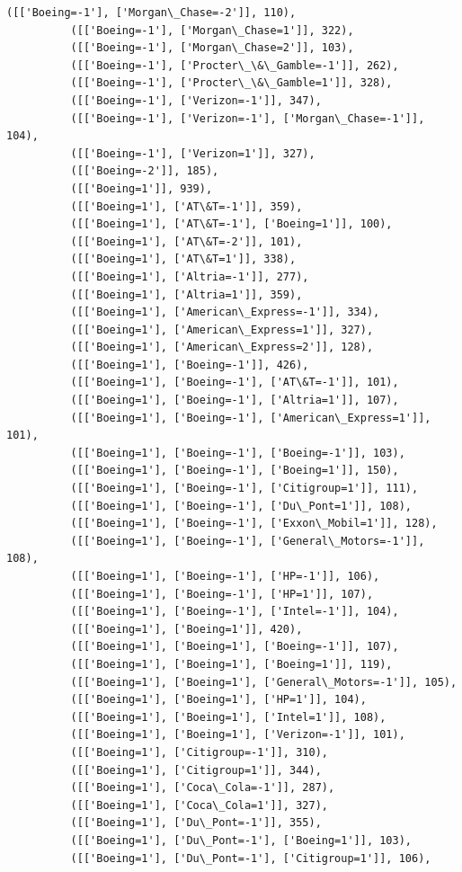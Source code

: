 \documentclass[11pt]{article}
\begin{document}
\begin{Verbatim}[commandchars=\\\{\}]
          ([['Boeing=-1'], ['Morgan\_Chase=-2']], 110),
          ([['Boeing=-1'], ['Morgan\_Chase=1']], 322),
          ([['Boeing=-1'], ['Morgan\_Chase=2']], 103),
          ([['Boeing=-1'], ['Procter\_\&\_Gamble=-1']], 262),
          ([['Boeing=-1'], ['Procter\_\&\_Gamble=1']], 328),
          ([['Boeing=-1'], ['Verizon=-1']], 347),
          ([['Boeing=-1'], ['Verizon=-1'], ['Morgan\_Chase=-1']], 104),
          ([['Boeing=-1'], ['Verizon=1']], 327),
          ([['Boeing=-2']], 185),
          ([['Boeing=1']], 939),
          ([['Boeing=1'], ['AT\&T=-1']], 359),
          ([['Boeing=1'], ['AT\&T=-1'], ['Boeing=1']], 100),
          ([['Boeing=1'], ['AT\&T=-2']], 101),
          ([['Boeing=1'], ['AT\&T=1']], 338),
          ([['Boeing=1'], ['Altria=-1']], 277),
          ([['Boeing=1'], ['Altria=1']], 359),
          ([['Boeing=1'], ['American\_Express=-1']], 334),
          ([['Boeing=1'], ['American\_Express=1']], 327),
          ([['Boeing=1'], ['American\_Express=2']], 128),
          ([['Boeing=1'], ['Boeing=-1']], 426),
          ([['Boeing=1'], ['Boeing=-1'], ['AT\&T=-1']], 101),
          ([['Boeing=1'], ['Boeing=-1'], ['Altria=1']], 107),
          ([['Boeing=1'], ['Boeing=-1'], ['American\_Express=1']], 101),
          ([['Boeing=1'], ['Boeing=-1'], ['Boeing=-1']], 103),
          ([['Boeing=1'], ['Boeing=-1'], ['Boeing=1']], 150),
          ([['Boeing=1'], ['Boeing=-1'], ['Citigroup=1']], 111),
          ([['Boeing=1'], ['Boeing=-1'], ['Du\_Pont=1']], 108),
          ([['Boeing=1'], ['Boeing=-1'], ['Exxon\_Mobil=1']], 128),
          ([['Boeing=1'], ['Boeing=-1'], ['General\_Motors=-1']], 108),
          ([['Boeing=1'], ['Boeing=-1'], ['HP=-1']], 106),
          ([['Boeing=1'], ['Boeing=-1'], ['HP=1']], 107),
          ([['Boeing=1'], ['Boeing=-1'], ['Intel=-1']], 104),
          ([['Boeing=1'], ['Boeing=1']], 420),
          ([['Boeing=1'], ['Boeing=1'], ['Boeing=-1']], 107),
          ([['Boeing=1'], ['Boeing=1'], ['Boeing=1']], 119),
          ([['Boeing=1'], ['Boeing=1'], ['General\_Motors=-1']], 105),
          ([['Boeing=1'], ['Boeing=1'], ['HP=1']], 104),
          ([['Boeing=1'], ['Boeing=1'], ['Intel=1']], 108),
          ([['Boeing=1'], ['Boeing=1'], ['Verizon=-1']], 101),
          ([['Boeing=1'], ['Citigroup=-1']], 310),
          ([['Boeing=1'], ['Citigroup=1']], 344),
          ([['Boeing=1'], ['Coca\_Cola=-1']], 287),
          ([['Boeing=1'], ['Coca\_Cola=1']], 327),
          ([['Boeing=1'], ['Du\_Pont=-1']], 355),
          ([['Boeing=1'], ['Du\_Pont=-1'], ['Boeing=1']], 103),
          ([['Boeing=1'], ['Du\_Pont=-1'], ['Citigroup=1']], 106),

\end{Verbatim}
\end{document}
